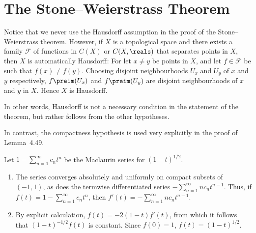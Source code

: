 \documentclass[article, a4paper, 11pt, oneside]{memoir}
\numberwithin{equation}{chapter}
\newcommand{\calF}{\mathcal{F}}
\theoremstyle{nonumberplain}
\begin{document}
\section{The Stone--Weierstrass Theorem}

\begin{remark}
	Notice that we never use the Hausdorff assumption in the proof of the Stone--Weierstrass theorem. However, if $X$ is a topological space and there exists a family $\calF$ of functions in $C(X)$ or $C(X,\reals)$ that separates points in $X$, then $X$ is automatically Hausdorff: For let $x \neq y$ be points in $X$, and let $f \in \calF$ be such that $f(x) \neq f(y)$. Choosing disjoint neighbourhoods $U_x$ and $U_y$ of $x$ and $y$ respectively, $f\preim(U_x)$ and $f\preim(U_y)$ are disjoint neighbourhoods of $x$ and $y$ in $X$. Hence $X$ is Hausdorff.

	In other words, Hausdorff is not a necessary condition in the statement of the theorem, but rather follows from the other hypotheses.

	In contrast, the compactness hypothesis is used very explicitly in the proof of Lemma~4.49.
\end{remark}

\begin{exerciseframed*}[66]
	Let $1 - \sum_{n=1}^\infty c_n t^n$ be the Maclaurin series for $(1 - t)^{1/2}$.
	\begin{enumerate}
		\item The series converges absolutely and uniformly on compact subsets of $(-1,1)$, as does the termwise differentiated series $- \sum_{n=1}^\infty n c_n t^{n-1}$. Thus, if $f(t) = 1 - \sum_{n=1}^\infty c_n t^n$, then $f'(t) = - \sum_{n=1}^\infty n c_n t^{n-1}$.

		\item By explicit calculation, $f(t) = -2(1-t) f'(t)$, from which it follows that $(1-t)^{-1/2} f(t)$ is constant. Since $f(0) = 1$, $f(t) = (1-t)^{1/2}$.
	\end{enumerate}
\end{exerciseframed*}
\end{document}
